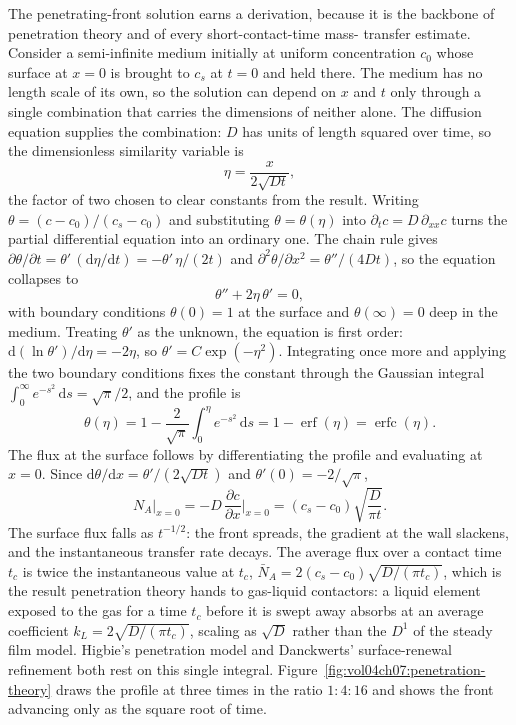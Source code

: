 The penetrating-front solution earns a derivation, because it is the
backbone of penetration theory and of every short-contact-time mass-
transfer estimate. Consider a semi-infinite medium initially at uniform
concentration $c_0$ whose surface at $x = 0$ is brought to $c_s$ at
$t = 0$ and held there. The medium has no length scale of its own, so the
solution can depend on $x$ and $t$ only through a single combination that
carries the dimensions of neither alone. The diffusion equation supplies
the combination: $D$ has units of length squared over time, so the
dimensionless similarity variable is
\[
\eta = \frac{x}{2\sqrt{Dt}},
\]
the factor of two chosen to clear constants from the result. Writing
$\theta = (c - c_0)/(c_s - c_0)$ and substituting $\theta = \theta(\eta)$
into $\partial_t c = D\,\partial_{xx} c$ turns the partial differential
equation into an ordinary one. The chain rule gives $\partial\theta/
\partial t = \theta'\,(\mathrm{d}\eta/\mathrm{d}t) = -\theta'\,\eta/(2t)$
and $\partial^2\theta/\partial x^2 = \theta''/(4Dt)$, so the equation
collapses to
\[
\theta'' + 2\eta\,\theta' = 0,
\]
with boundary conditions $\theta(0) = 1$ at the surface and $\theta(\infty)
= 0$ deep in the medium. Treating $\theta'$ as the unknown, the equation is
first order: $\mathrm{d}(\ln\theta')/\mathrm{d}\eta = -2\eta$, so
$\theta' = C\exp(-\eta^2)$. Integrating once more and applying the two
boundary conditions fixes the constant through the Gaussian integral
$\int_0^\infty e^{-s^2}\,\mathrm{d}s = \sqrt{\pi}/2$, and the profile is
\[
\theta(\eta) = 1 - \frac{2}{\sqrt{\pi}}\int_0^{\eta} e^{-s^2}\,\mathrm{d}s
= 1 - \operatorname{erf}(\eta) = \operatorname{erfc}(\eta).
\]
The flux at the surface follows by differentiating the profile and
evaluating at $x = 0$. Since $\mathrm{d}\theta/\mathrm{d}x = \theta'/(2
\sqrt{Dt})$ and $\theta'(0) = -2/\sqrt{\pi}$,
\[
N_A\big|_{x=0} = -D\,\frac{\partial c}{\partial x}\bigg|_{x=0} =
(c_s - c_0)\sqrt{\frac{D}{\pi t}}.
\]
The surface flux falls as $t^{-1/2}$: the front spreads, the gradient at
the wall slackens, and the instantaneous transfer rate decays. The
average flux over a contact time $t_c$ is twice the instantaneous value at
$t_c$, $\bar N_A = 2(c_s - c_0)\sqrt{D/(\pi t_c)}$, which is the result
penetration theory hands to gas-liquid contactors: a liquid element
exposed to the gas for a time $t_c$ before it is swept away absorbs at an
average coefficient $k_L = 2\sqrt{D/(\pi t_c)}$, scaling as $\sqrt{D}$
rather than the $D^{1}$ of the steady film model. Higbie's penetration
model and Danckwerts' surface-renewal refinement both rest on this single
integral. Figure~\ref{fig:vol04ch07:penetration-theory} draws the profile
at three times in the ratio $1:4:16$ and shows the front advancing only as
the square root of time.


